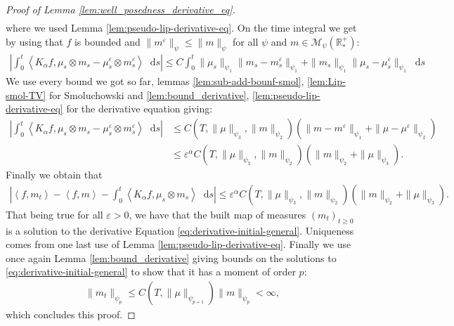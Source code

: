 \documentclass[11pt,a4paper]{article}
\newcommand{\RRP}{\mathbb{R}^+_*}
\newcommand{\MC}{\mathcal{M}}
\newcommand{\Proc}[1]{\left(#1\right)_{t\geq 0}}
\newcommand{\brac}[1]{\left\langle#1\right\rangle}
\newcommand{\dd}{\mathop{}\!\mathrm{d}}
\begin{document}
\begin{proof}[Proof of Lemma \ref{lem:well_posedness_derivative_eq}]
\begin{align*}
    \end{align*}
    where we used Lemma \ref{lem:pseudo-lip-derivative-eq}. On the time integral we get by using that $f$ is bounded and $\|m^\varepsilon\|_{\psi} \leq \|m\|_\psi$ for all $\psi$ and $m \in \MC_{\psi}(\RRP)$:
    \begin{align*}
        \left|\int_0^t \brac{K_\alpha f,\mu_s \otimes m_s - \mu^\varepsilon_s \otimes m^\varepsilon_s} \dd s\right| 
        \leq C\int_0^t \|\mu_s\|_{\psi_1} \|m_s - m_s^\varepsilon\|_{\psi_1}+ \|m_s\|_{\psi_1} \|\mu_s - \mu_s^\varepsilon\|_{\psi_1}\dd s 
    \end{align*}
    We use every bound we got so far, lemmas \ref{lem:sub-add-bounf-smol}, \ref{lem:Lip-smol-TV} for Smoluchowski and \ref{lem:bound_derivative}, \ref{lem:pseudo-lip-derivative-eq} for the derivative equation giving:
    \begin{align*}
        \left|\int_0^t \brac{K_\alpha f,\mu_s \otimes m_s - \mu^\varepsilon_s \otimes m^\varepsilon_s} \dd s\right| 
        &\leq C(T,\|\mu\|_{\psi_3},\|m\|_{\psi_2})\left(\| m - m^\varepsilon\|_{\psi_1} + \| \mu - \mu^\varepsilon\|_{\psi_2}\right)\\
        &\leq \varepsilon^\alpha C(T,\|\mu\|_{\psi_3},\|m\|_{\psi_2})\left(\| m \|_{\psi_2} + \| \mu \|_{\psi_3}\right).
    \end{align*}
    Finally we obtain that 
    \begin{align*}
        \left| \brac{f,m_t} - \brac{f,m} - \int_0^t \brac{K_\alpha f,\mu_s \otimes m_s} \dd s\right| \leq \varepsilon^\alpha C(T,\|\mu\|_{\psi_3},\|m\|_{\psi_2})\left(\| m \|_{\psi_2} + \| \mu \|_{\psi_3}\right).
    \end{align*}
    That being true for all $\varepsilon > 0$, we have that the built map of measures $\Proc{m_t}$ is a solution to the derivative Equation \eqref{eq:derivative-initial-general}. Uniqueness comes from one last use of Lemma \ref{lem:pseudo-lip-derivative-eq}. Finally we use once again Lemma \ref{lem:bound_derivative} giving bounds on the solutions to \eqref{eq:derivative-initial-general} to show that it has a moment of order $p$:
    \begin{align*}
        \| m_t \|_{\psi_p} \leq C(T,\|\mu\|_{\psi_{p+1}})\|m\|_{\psi_p} < \infty,
    \end{align*}
    which concludes this proof.
\end{proof}
\end{document}
